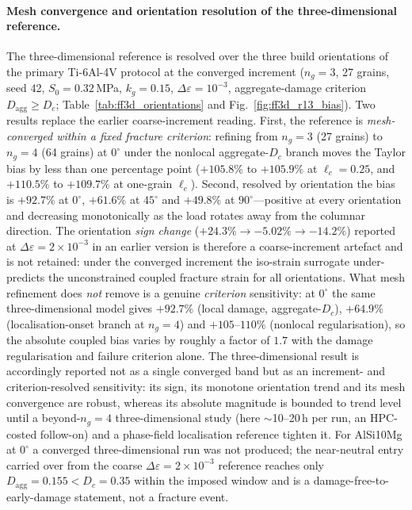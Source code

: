 \documentclass[11pt,a4paper,twocolumn]{article}
\providecommand{\ang}[1]{\ensuremath{#1^{\circ}}}
\begin{document}
\paragraph{Mesh convergence and orientation resolution of the three-dimensional reference.}
The three-dimensional reference is resolved over the three build orientations of the primary Ti-6Al-4V
protocol at the converged increment ($n_g=3$, 27 grains, seed 42, $S_0=0.32$\,MPa, $k_g=0.15$,
$\Delta\varepsilon=10^{-3}$, aggregate-damage criterion $D_{\mathrm{agg}}\ge D_c$;
Table~\ref{tab:ff3d_orientations} and Fig.~\ref{fig:ff3d_r13_bias}). Two results replace the earlier
coarse-increment reading. First, the reference is \emph{mesh-converged within a fixed fracture criterion}:
refining from $n_g=3$ (27 grains) to $n_g=4$ (64 grains) at $\ang{0}$ under the nonlocal aggregate-$D_c$
branch moves the Taylor bias by less than one percentage point ($+105.8\%$ to $+105.9\%$ at
$\ell_c=0.25$, and $+110.5\%$ to $+109.7\%$ at one-grain $\ell_c$). Second, resolved by orientation the
bias is $+92.7\%$ at $\ang{0}$, $+61.6\%$ at $\ang{45}$ and $+49.8\%$ at $\ang{90}$---positive at every
orientation and decreasing monotonically as the load rotates away from the columnar direction. The
orientation \emph{sign change} ($+24.3\%\to-5.02\%\to-14.2\%$) reported at $\Delta\varepsilon=2\times10^{-3}$
in an earlier version is therefore a coarse-increment artefact and is not retained: under the converged
increment the iso-strain surrogate under-predicts the unconstrained coupled fracture strain for all
orientations. What mesh refinement does \emph{not} remove is a genuine \emph{criterion} sensitivity: at
$\ang{0}$ the same three-dimensional model gives $+92.7\%$ (local damage, aggregate-$D_c$), $+64.9\%$
(localisation-onset branch at $n_g=4$) and $+105$--$110\%$ (nonlocal regularisation), so the absolute
coupled bias varies by roughly a factor of $1.7$ with the damage regularisation and failure criterion
alone. The three-dimensional result is accordingly reported not as a single converged band but as an
increment- and criterion-resolved sensitivity: its sign, its monotone orientation trend and its mesh
convergence are robust, whereas its absolute magnitude is bounded to trend level until a beyond-$n_g=4$
three-dimensional study (here $\sim$10--20\,h per run, an HPC-costed follow-on) and a phase-field
localisation reference tighten it. For AlSi10Mg at $\ang{0}$ a converged three-dimensional run was not
produced; the near-neutral entry carried over from the coarse $\Delta\varepsilon=2\times10^{-3}$ reference
reaches only $D_{\mathrm{agg}}=0.155<D_c=0.35$ within the imposed window and is a
damage-free-to-early-damage statement, not a fracture event.
\end{document}

